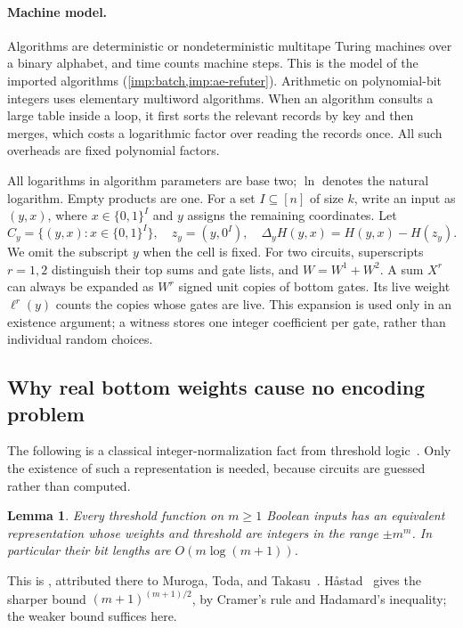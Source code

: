 \documentclass[11pt,letterpaper]{article}
\newtheorem{lemma}[theorem]{Lemma}
\theoremstyle{definition}
\theoremstyle{remark}
\begin{document}
\paragraph{Machine model.}
Algorithms are deterministic or nondeterministic multitape Turing
machines over a binary alphabet, and time counts machine steps. This is
the model of the imported algorithms (\cref{imp:batch,imp:ae-refuter}).
Arithmetic on polynomial-bit integers uses elementary multiword
algorithms. When an algorithm consults a large table inside a loop, it
first sorts the relevant records by key and then merges, which costs a
logarithmic factor over reading the records once. All such overheads
are fixed polynomial factors.

All logarithms in algorithm parameters are base two; \(\ln\) denotes
the natural logarithm. Empty products are one. For a set
\(I\subseteq[n]\) of size \(k\), write an input as \((y,x)\), where
\(x\in\{0,1\}^I\) and \(y\) assigns the remaining coordinates.
Let
\[
 C_y=\{(y,x):x\in\{0,1\}^I\},\quad z_y=(y,0^I),\quad
 \Delta_y H(y,x)=H(y,x)-H(z_y).
\]
We omit the subscript \(y\) when the cell is fixed. For two circuits,
superscripts \(r=1,2\) distinguish their top sums and gate lists, and
\(W=W^1+W^2\). A sum \(X^r\) can always be expanded as \(W^r\)
signed unit copies of bottom gates. Its live weight \(\ell^r(y)\)
counts the copies whose gates are live. This expansion is used only
in an existence argument; a witness stores one integer coefficient per
gate, rather than individual random choices.

\subsection{Why real bottom weights cause no encoding problem}

The following is a classical integer-normalization fact from threshold
logic~\cite{MTT61}. Only the existence of such a representation
is needed, because circuits are guessed rather than computed.

\begin{lemma}\label{lem:integer}
Every threshold function on \(m\ge1\) Boolean inputs has an equivalent
representation whose weights and threshold are integers in the range
\(\pm m^m\). In particular their bit lengths are \(O(m\log(m+1))\).
\end{lemma}
This is \cite[Lemma~3.2]{CTW26}, attributed there to Muroga, Toda, and
Takasu~\cite{MTT61}. H{\aa}stad~\cite[Section~3]{Has94} gives the sharper
bound \((m+1)^{(m+1)/2}\), by Cramer's rule and Hadamard's inequality; the
weaker bound suffices here.
\end{document}
